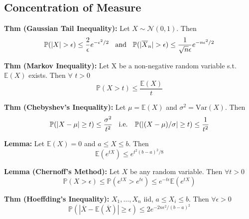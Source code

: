 \documentclass[10pt,twocolumn]{article}
\begin{document}
\subsection*{Concentration of Measure}
    \textbf{Thm (Gaussian Tail Inequality):}
    Let $X \sim \mathcal{N}(0,1)$. Then
    \begin{equation}
        \mathbb{P}(|X| > \epsilon) \leq \frac{2}{\epsilon}e^{-\epsilon^{2}/2} \hspace{2mm}\text{ and } \hspace{2mm}
        \mathbb{P}(|\overline{X}_{n}| > \epsilon) \leq \frac{1}{\sqrt{n}\epsilon}e^{-n\epsilon^{2}/2}
    \end{equation}
        
    \textbf{Thm (Markov Inequality):}
    Let X be a non-negative random variable s.t. $\mathbb{E}(X)$ exists. Then $\forall$ $t>0$
    \begin{equation}
        \mathbb{P}(X>t) \leq \frac{\mathbb{E}(X)}{t}
    \end{equation}

    \textbf{Thm (Chebyshev's Inequality):}
    Let $\mu = \mathbb{E}(X)$ and $\sigma^{2} = \text{Var}(X)$. Then
    \begin{equation}
        \mathbb{P}(|X-\mu| \geq t) \leq \frac{\sigma^{2}}{t^{2}} \hspace{2mm} \text{ i.e. } \hspace{2mm}
        \mathbb{P}(|(X-\mu)/\sigma| \geq t) \leq \frac{1}{t^{2}}
    \end{equation}

    \textbf{Lemma:}
    Let $\mathbb{E}(X) = 0$ and $a \leq X \leq b$. Then
    \begin{equation}
        \mathbb{E}(e^{tX}) \leq e^{t^{2}(b-a)^{2}/8}
    \end{equation}

    \textbf{Lemma (Chernoff's Method):}
    Let $X$ be any random variable. Then $\forall t>0$
    \begin{equation}
        \mathbb{P}(X>\epsilon) \leq \mathbb{P}(e^{tX}>e^{t\epsilon}) \leq e^{-t\epsilon} \mathbb{E}(e^{tX})
    \end{equation}

    \textbf{Thm (Hoeffding's Inequality):}
    $X_{1},\ldots,X_{n}$ iid, $a \leq X_{i} \leq b$. Then $\forall \epsilon >0$
    \begin{equation}
        \mathbb{P} \left(\left| \overline{X} - \mathbb{E}\left(\overline{X}\right) \right| \geq \epsilon \right) \leq 2e^{-2n\epsilon^{2}/(b-a)^{2}}
    \end{equation}
\end{document}

